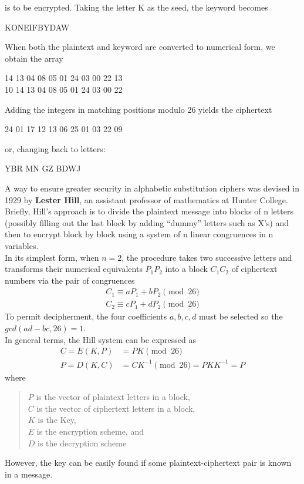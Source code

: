 \documentclass{article}
\begin{document}
is to be encrypted. Taking the letter K as the seed, the keyword becomes
\begin{center}
    KONEIFBYDAW
\end{center}
When both the plaintext and keyword are converted to numerical form, we obtain the array
\begin{center}
    14 13 04 08 05 01 24 03 00 22 13\\
    10 14 13 04 08 05 01 24 03 00 22
\end{center}
Adding the integers in matching positions modulo 26 yields the ciphertext
\begin{center}
    24 01 17 12 13 06 25 01 03 22 09
\end{center}
or, changing back to letters:
\begin{center}
    YBR MN GZ BDWJ
\end{center}

A way to ensure greater security in alphabetic substitution ciphers was devised in 1929 by {\bf Lester Hill}, an assistant professor of mathematics at Hunter College. Briefly, Hill's approach is to divide the plaintext message into blocks of n letters (possibly filling out the last block by adding “dummy” letters such as X's) and then to encrypt block by block using a system of n linear congruences in n variables.\\
In its simplest form, when $n = 2$, the procedure takes two successive letters and
transforms their numerical equivalents $P_1P_2$ into a block $C_1C_2$ of ciphertext
numbers via the pair of congruences
\begin{align*}
    C_1 \equiv aP_1 + bP_2 \pmod {26} \\
    C_2 \equiv cP_1 + dP_2 \pmod {26}
\end{align*}
To permit decipherment, the four coefficients $a, b, c, d$ must be selected so the $gcd(ad - bc, 26) = 1$.\\
In general terms, the Hill system can be expressed as
\begin{align*}
    C = E(K, P) &= PK \pmod {26}\\
    P = D(K, C) &= CK^{-1} \pmod {26} = PKK^{-1} = P
\end{align*}
where
\begin{quote}
    $P$ is the vector of plaintext letters in a block,\\
    $C$ is the vector of ciphertext letters in a block,\\
    $K$ is the Key,\\
    $E$ is the encryption scheme, and\\
    $D$ is the decryption scheme
\end{quote}
However, the key can be easily found if some plaintext-ciphertext pair is known in a message.
\end{document}

